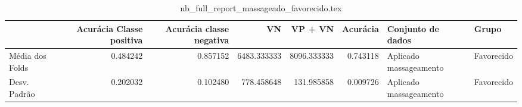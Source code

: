 \begin{table}
\centering
\caption{nb_full_report_massageado_favorecido.tex}
\label{nb_full_report_massageado_favorecido.tex}
\begin{tabular}{lrrrrrll}
\toprule
{}              &  Acurácia Classe positiva &  Acurácia classe negativa &          VN  &     VP + VN  &  Acurácia &       Conjunto de dados &       Grupo \\
\midrule
Média dos Folds &                  0.484242 &                  0.857152 &  6483.333333 &  8096.333333 &  0.743118 &  Aplicado massageamento &  Favorecido \\
Desv. Padrão    &                  0.202032 &                  0.102480 &   778.458648 &   131.985858 &  0.009726 &  Aplicado massageamento &  Favorecido \\
\bottomrule
\end{tabular}
\end{table}
